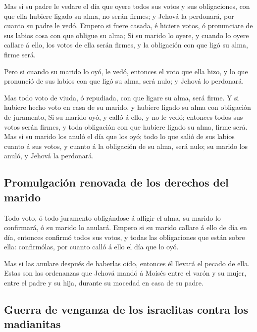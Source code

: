  Mas si su padre le vedare el día que oyere todos sus votos
y sus obligaciones, con que ella hubiere ligado su alma, no serán
firmes; y Jehová la perdonará, por cuanto su padre le vedó. 
Empero si fuere casada, é hiciere votos, ó pronunciare de sus labios
cosa con que obligue su alma;  Si su marido lo oyere, y
cuando lo oyere callare á ello, los votos de ella serán firmes, y la
obligación con que ligó su alma, firme será.

 Pero si cuando su marido lo oyó, le vedó, entonces el voto
que ella hizo, y lo que pronunció de sus labios con que ligó su alma,
será nulo; y Jehová lo perdonará.

 Mas todo voto de viuda, ó repudiada, con que ligare su
alma, será firme.  Y si hubiere hecho voto en casa de su
marido, y hubiere ligado su alma con obligación de juramento,
 Si su marido oyó, y calló á ello, y no le vedó; entonces
todos sus votos serán firmes, y toda obligación con que hubiere ligado
su alma, firme será.  Mas si su marido los anuló el día que
los oyó; todo lo que salió de sus labios cuanto á sus votos, y cuanto á
la obligación de su alma, será nulo; su marido los anuló, y Jehová la
perdonará.

\hypertarget{promulgaciuxf3n-renovada-de-los-derechos-del-marido}{%
\subsection{Promulgación renovada de los derechos del
marido}\label{promulgaciuxf3n-renovada-de-los-derechos-del-marido}}

 Todo voto, ó todo juramento obligándose á afligir el alma,
su marido lo confirmará, ó su marido lo anulará.  Empero si
su marido callare á ello de día en día, entonces confirmó todos sus
votos, y todas las obligaciones que están sobre ella: confirmólas, por
cuanto calló á ello el día que lo oyó.

 Mas si las anulare después de haberlas oído, entonces él
llevará el pecado de ella. Estas son las ordenanzas que Jehová mandó á
Moisés entre el varón y su mujer, entre el padre y su hija, durante su
mocedad en casa de su padre.

\hypertarget{guerra-de-venganza-de-los-israelitas-contra-los-madianitas}{%
\subsection{Guerra de venganza de los israelitas contra los
madianitas}\label{guerra-de-venganza-de-los-israelitas-contra-los-madianitas}}

